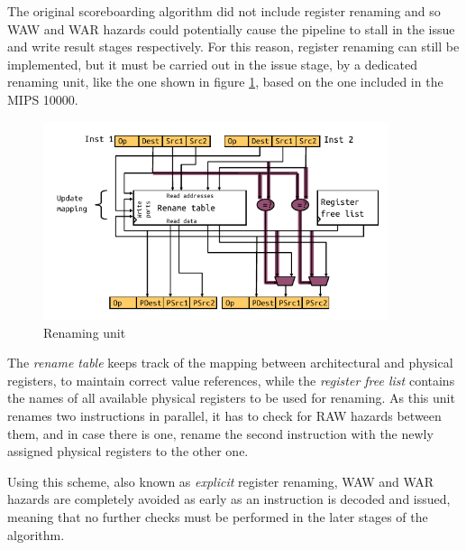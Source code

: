 The original scoreboarding algorithm did not include register renaming and so \ac{WAW} and \ac{WAR} hazards could potentially cause the pipeline to stall in the issue and write result stages respectively. For this reason, register renaming can still be implemented, but it must be carried out in the issue stage, by a dedicated renaming unit, like the one shown in figure \ref{fig:renaming}, based on the one included in the MIPS 10000.
\begin{figure}[hbtp]
  \centering
  \includegraphics[width=0.9\textwidth]{img/renaming.pdf}
  \caption{Renaming unit}
  \label{fig:renaming}
\end{figure}
The \emph{rename table} keeps track of the mapping between architectural and physical registers, to maintain correct value references, while the \emph{register free list} contains the names of all available physical registers to be used for renaming. As this unit renames two instructions in parallel, it has to check for \ac{RAW} hazards between them, and in case there is one, rename the second instruction with the newly assigned physical registers to the other one. 

Using this scheme, also known as \emph{explicit} register renaming, \ac{WAW} and \ac{WAR} hazards are completely avoided as early as an instruction is decoded and issued, meaning that no further checks must be performed in the later stages of the algorithm.

